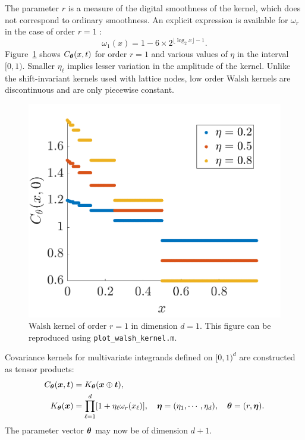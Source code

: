 \documentclass[graybox,footinfo]{svmult}
\newcommand{\JRNote}[1]{{\textcolor{green}{JR: #1}}}
\begin{document}
The parameter $r$ is a measure of the digital smoothness of the kernel, which does not correspond to ordinary smoothness.  An explicit expression is available for $\omega_{r}$ in the case of order $r=1$ \cite{Nuyens2013}:
\begin{equation}
\label{FJ:eqn:omega1}
\omega_1(x) 
= 1  - 6 \times 2^{\lfloor \log_2 x \rfloor -1 }.
\end{equation}
Figure~\ref{FJ:fig:walshkernel-dim1} shows $C_{\boldsymbol{\theta}} (x,t)$ for order $r=1$ and various values of $\eta$ in the interval $[0,1)$. Smaller $\eta_\ell$ implies lesser variation in the amplitude of the kernel.  Unlike the shift-invariant kernels used with lattice nodes, low order Walsh kernels are discontinuous and are only piecewise constant. 

\begin{figure}
	\centering
	\includegraphics[width=0.9\linewidth]{"figures/walsh_kernel dim_1"}
	\caption[Walsh kernel]{Walsh kernel of order $r=1$ in dimension $d=1$. This figure can be reproduced using \texttt{plot\_walsh\_kernel.m}. %
	}
	\label{FJ:fig:walshkernel-dim1}
\end{figure}

Covariance kernels for multivariate integrands defined on $[0,1)^d$ are constructed as tensor products:
\begin{align}
\label{FJ:eqn:digital_shift_in_kernel}
C_{\bstheta}(\bsx, \bst) &= K_{\bstheta} (\bsx \oplus \bst), \\
\label{FJ:eqn:walsh_kernel}
K_{\bstheta} (\bsx) & =  
\prod_{\ell=1}^d  [1 + \eta_\ell \omega_{r} (x_\ell)], \quad \bseta = (\eta_1, \cdots, \eta_d), \quad \bstheta = (r, \bseta).
\end{align}
The parameter vector ${\boldsymbol{\theta}}$ may now be of dimension $d+1$.
\end{document}
